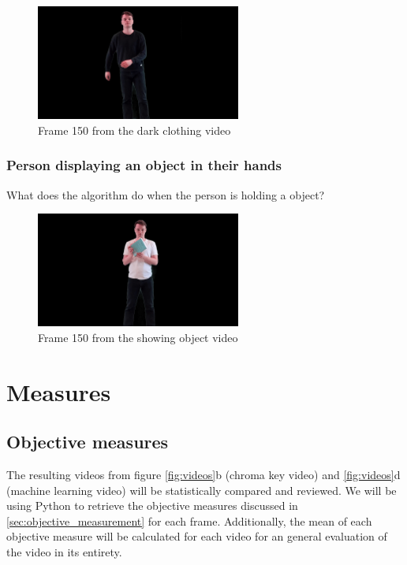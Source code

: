 \begin{figure}[H]
    \centering
    \includegraphics[width=0.6\textwidth]{img/video_frame_150/FG_Rocking-Dark_150.jpg}
    \caption{Frame 150 from the dark clothing video}
    \label{fig:foreground_dark_clothing}
\end{figure}


\subsubsection{Person displaying an object in their hands}
What does the algorithm do when the person is holding a object? 

\begin{figure}[H]
    \centering
    \includegraphics[width=0.6\textwidth]{img/video_frame_150/FG_Showing-Object_150.jpg}
    \caption{Frame 150 from the showing object video}
    \label{fig:foreground_showing_object}
\end{figure}



\section{Measures}
\subsection{Objective measures}
The resulting videos from figure \ref{fig:videos}b (chroma key video) and \ref{fig:videos}d (machine learning video) will be statistically compared and reviewed. We will be using Python to retrieve the objective measures discussed in \autoref{sec:objective_measurement} for each frame. Additionally, the mean of each objective measure will be calculated for each video for an general evaluation of the video in its entirety. 



